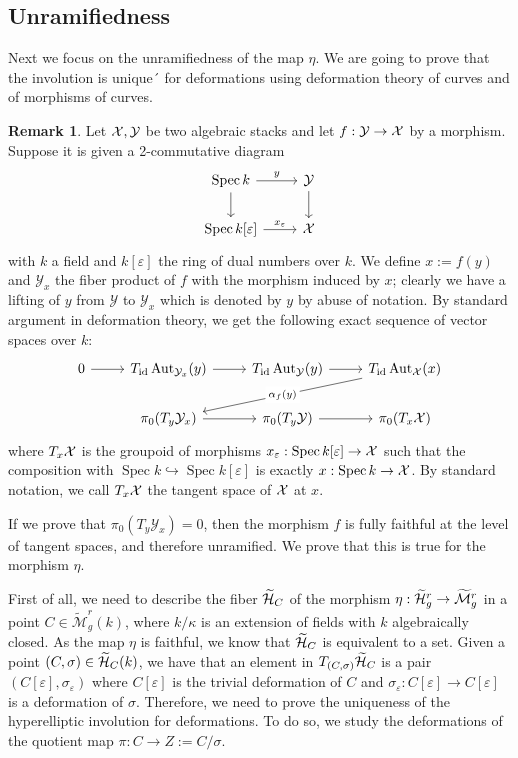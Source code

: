 \documentclass{alggeom}
\numberwithin{equation}{section}
\numberwithin{subsection}{section}
\theoremstyle{definition}
\newtheorem{remark}[theorem]{Remark}
\theoremstyle{remark}
\newcommand\cY{\mathcal{Y}} \newcommand\cZ{\mathcal{Z}}
\newcommand\arr{\ifinner\to\else\longrightarrow\fi}
\newcommand\aut{\operatorname{Aut}}
\newcommand\spec{\operatorname{Spec}}
\newcommand\id{\mathrm{id}}
\renewcommand{\epsilon}{\varepsilon}
\newcommand{\Mtilde}{\widetilde{\mathcal M}}
\newcommand{\Htilde}{\widetilde{\cH}}
\begin{document}
\subsection*{Unramifiedness}

Next we focus on the unramifiedness of the map $\eta$. We are going to prove that the involution is unique´ for deformations using deformation theory of curves and of morphisms of curves.

\begin{remark}\label{rem:deformation}
Let $\cX,\cY$ be two algebraic stacks and let $f:\cY\arr \cX$ by a morphism. Suppose it is given a 2-commutative diagram
$$
\begin{tikzcd}
\spec k\arrow[r, "y"] \arrow[d] & \cY \arrow[d] \\
{\spec k[\epsilon]} \arrow[r, "x_{\epsilon}"]          & \cX                       
\end{tikzcd}
$$ 
with $k$ a field and $k[\epsilon]$ the ring of dual numbers over $k$. We define $x:=f(y)$ and $\cY_x$ the fiber product of $f$ with the morphism induced by $x$; clearly we have a lifting of $y$ from $\cY$ to $\cY_x$ which is denoted by $y$ by abuse of notation. By standard argument in deformation theory, we get the following exact sequence of vector spaces over $k$:
$$
\begin{tikzcd}
0 \arrow[r] & T_{\id}\aut_{\cY_x}(y) \arrow[r] & T_{\id}\aut_{\cY}(y) \arrow[r] & T_{\id}\aut_{\cX}(x) \arrow[lld, "\alpha_f(y)" description ] \\
& \pi_0(T_{y}\cY_x) \arrow[r]        & \pi_0(T_y\cY) \arrow[r]          & \pi_0(T_x\cX)                     
\end{tikzcd}
$$ 
where $T_x \mathcal{X}$ is the groupoid of morphisms $x_{\epsilon}:\spec k[\epsilon] \arr \cX$ such that the composition with $\spec k \hookrightarrow \spec k[\epsilon]$ is exactly $x:\spec k \arr \cX$. By standard notation, we call $T_x\mathcal{X}$ the tangent space of $\mathcal{X}$ at $x$.
\end{remark} 

If we prove that $\pi_0(T_y\cY_x)=0$, then the morphism $f$ is fully faithful at the level of tangent spaces, and therefore unramified. We prove that this is true for the morphism $\eta$. 

First of all, we need to describe the fiber $\Htilde_C$ of the morphism $\eta: \Htilde_g^r \rightarrow \Mtilde_g^r$ in a point $C \in \Mtilde_g^r(k)$, where $k/\kappa$ is an extension of fields with $k$ algebraically closed. As the map $\eta$ is faithful, we know that $\Htilde_C$ is equivalent to a set. Given a point $(C,\sigma)\in \Htilde_C(k)$, we have that an element in $T_{(C,\sigma)}\Htilde_C$ is a pair $(C[\epsilon],\sigma_{\epsilon})$ where $C[\epsilon]$ is the trivial deformation of $C$ and $\sigma_{\epsilon}:C[\epsilon]\rightarrow C[\epsilon]$ is a deformation of $\sigma$. Therefore, we need to prove the uniqueness of the hyperelliptic involution for deformations. To do so, we study the deformations of the quotient map $\pi: C \rightarrow Z:=C/\sigma$. 
\end{document}
